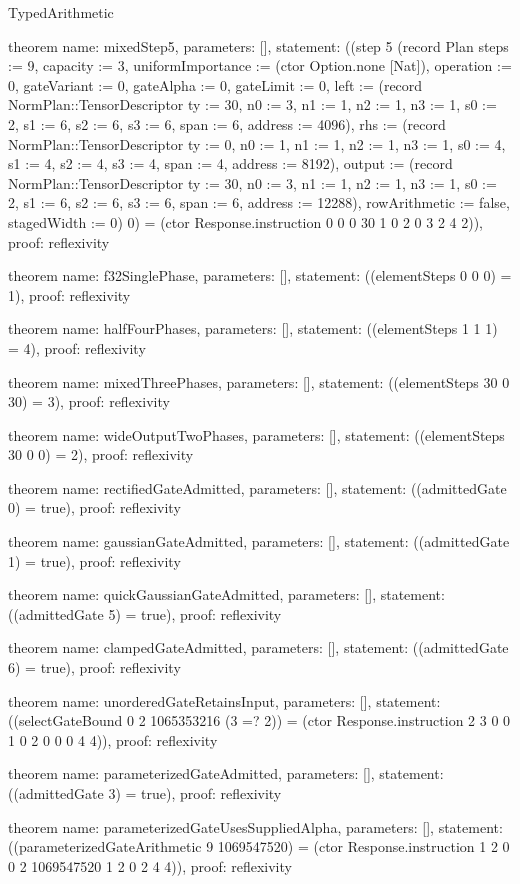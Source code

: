 \begin{lexlean}{TypedArithmetic}
\begin{semanticmodule}
theorem{
  name: mixedStep5,
  parameters: [],
  statement: ((step 5 (record Plan {steps := 9, capacity := 3, uniformImportance := (ctor Option.none [Nat]), operation := 0, gateVariant := 0, gateAlpha := 0, gateLimit := 0, left := (record NormPlan::TensorDescriptor {ty := 30, n0 := 3, n1 := 1, n2 := 1, n3 := 1, s0 := 2, s1 := 6, s2 := 6, s3 := 6, span := 6, address := 4096}), rhs := (record NormPlan::TensorDescriptor {ty := 0, n0 := 1, n1 := 1, n2 := 1, n3 := 1, s0 := 4, s1 := 4, s2 := 4, s3 := 4, span := 4, address := 8192}), output := (record NormPlan::TensorDescriptor {ty := 30, n0 := 3, n1 := 1, n2 := 1, n3 := 1, s0 := 2, s1 := 6, s2 := 6, s3 := 6, span := 6, address := 12288}), rowArithmetic := false, stagedWidth := 0}) 0) = (ctor Response.instruction 0 0 0 30 1 0 2 0 3 2 4 2)),
  proof: reflexivity{}
}

theorem{
  name: f32SinglePhase,
  parameters: [],
  statement: ((elementSteps 0 0 0) = 1),
  proof: reflexivity{}
}

theorem{
  name: halfFourPhases,
  parameters: [],
  statement: ((elementSteps 1 1 1) = 4),
  proof: reflexivity{}
}

theorem{
  name: mixedThreePhases,
  parameters: [],
  statement: ((elementSteps 30 0 30) = 3),
  proof: reflexivity{}
}

theorem{
  name: wideOutputTwoPhases,
  parameters: [],
  statement: ((elementSteps 30 0 0) = 2),
  proof: reflexivity{}
}

theorem{
  name: rectifiedGateAdmitted,
  parameters: [],
  statement: ((admittedGate 0) = true),
  proof: reflexivity{}
}

theorem{
  name: gaussianGateAdmitted,
  parameters: [],
  statement: ((admittedGate 1) = true),
  proof: reflexivity{}
}

theorem{
  name: quickGaussianGateAdmitted,
  parameters: [],
  statement: ((admittedGate 5) = true),
  proof: reflexivity{}
}

theorem{
  name: clampedGateAdmitted,
  parameters: [],
  statement: ((admittedGate 6) = true),
  proof: reflexivity{}
}

theorem{
  name: unorderedGateRetainsInput,
  parameters: [],
  statement: ((selectGateBound 0 2 1065353216 (3 =? 2)) = (ctor Response.instruction 2 3 0 0 1 0 2 0 0 0 4 4)),
  proof: reflexivity{}
}

theorem{
  name: parameterizedGateAdmitted,
  parameters: [],
  statement: ((admittedGate 3) = true),
  proof: reflexivity{}
}

theorem{
  name: parameterizedGateUsesSuppliedAlpha,
  parameters: [],
  statement: ((parameterizedGateArithmetic 9 1069547520) = (ctor Response.instruction 1 2 0 0 2 1069547520 1 2 0 2 4 4)),
  proof: reflexivity{}
}


\end{semanticmodule}
\end{lexlean}
